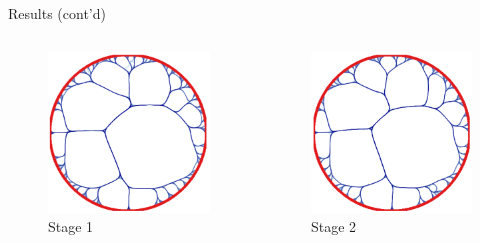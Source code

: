 \documentclass{beamer}
\begin{document}
\begin{frame}{Results (cont'd)}
	\begin{columns}
		\begin{column}{.48\textwidth}
			\begin{figure}[ht]
				\centering
				\includegraphics[width=1\textwidth]{img/stage1.png}
				\caption{Stage 1\label{fig:stage1}}
			\end{figure}
		\end{column}
		\begin{column}{.48\textwidth}
			\begin{figure}[ht]
				\centering
				\includegraphics[width=1\textwidth]{img/stage2.png}
				\caption{Stage 2\label{fig:stage2}}
			\end{figure}
		\end{column}
	\end{columns}
\end{frame}
\end{document}
